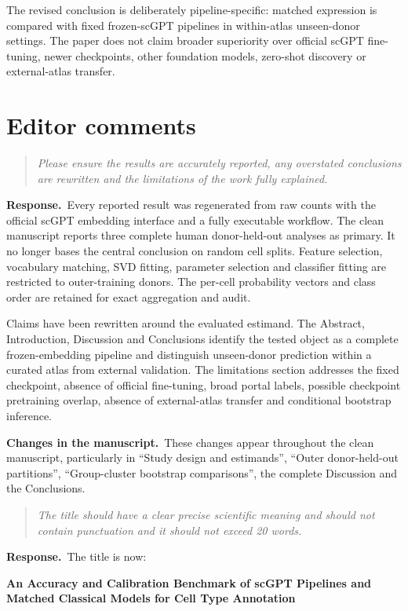 \documentclass[11pt,a4paper]{article}
\newcommand{\commenttext}[1]{\begin{quote}\itshape #1\end{quote}}
\newcommand{\responsehead}{\par\noindent\textbf{Response.}\ }
\newcommand{\changehead}{\par\noindent\textbf{Changes in the manuscript.}\ }
\begin{document}
The revised conclusion is deliberately pipeline-specific: matched expression is compared with fixed frozen-scGPT pipelines in within-atlas unseen-donor settings. The paper does not claim broader superiority over official scGPT fine-tuning, newer checkpoints, other foundation models, zero-shot discovery or external-atlas transfer.

\section*{Editor comments}

\commenttext{Please ensure the results are accurately reported, any overstated conclusions are rewritten and the limitations of the work fully explained.}

\responsehead Every reported result was regenerated from raw counts with the official scGPT embedding interface and a fully executable workflow. The clean manuscript reports three complete human donor-held-out analyses as primary. It no longer bases the central conclusion on random cell splits. Feature selection, vocabulary matching, SVD fitting, parameter selection and classifier fitting are restricted to outer-training donors. The per-cell probability vectors and class order are retained for exact aggregation and audit.

Claims have been rewritten around the evaluated estimand. The Abstract, Introduction, Discussion and Conclusions identify the tested object as a complete frozen-embedding pipeline and distinguish unseen-donor prediction within a curated atlas from external validation. The limitations section addresses the fixed checkpoint, absence of official fine-tuning, broad portal labels, possible checkpoint pretraining overlap, absence of external-atlas transfer and conditional bootstrap inference.

\changehead These changes appear throughout the clean manuscript, particularly in ``Study design and estimands'', ``Outer donor-held-out partitions'', ``Group-cluster bootstrap comparisons'', the complete Discussion and the Conclusions.

\commenttext{The title should have a clear precise scientific meaning and should not contain punctuation and it should not exceed 20 words.}

\responsehead The title is now:

\begin{center}
\textbf{An Accuracy and Calibration Benchmark of scGPT Pipelines and Matched Classical Models for Cell Type Annotation}
\end{center}
\end{document}
